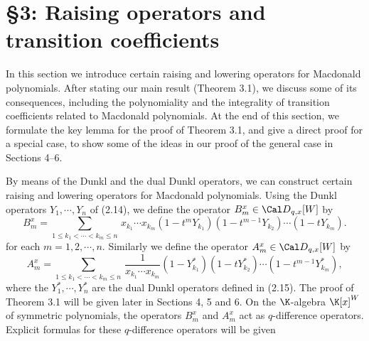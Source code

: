 \section{\S3: Raising operators and transition coefficients}
In this section we introduce certain raising and lowering operators 
for Macdonald polynomials.  
After stating our main result (Theorem 3.1), 
we discuss some of its consequences, 
including the polynomiality and the integrality of 
transition coefficients related to Macdonald polynomials.   
At the end of this section, we formulate the key lemma 
for the proof of Theorem 3.1, and give a direct proof for a special case, 
to show some of the ideas in our proof of the general case in 
Sections 4--6. 
%
\par\medpagebreak
By means of the Dunkl and the dual Dunkl operators, we can construct 
certain raising and lowering operators for Macdonald polynomials. 
Using the Dunkl operators $Y_1,\cdots, Y_n$ of (2.14), 
we define the operator $B^x_m \in {\Cal D}_{q,x}[W]$ by
$$
B^x_m=\sum_{1\le k_1<\cdots<k_m\le n}\,
x_{k_1}\cdots x_{k_m}
(1-t^m Y_{k_1})(1-t^{m-1}Y_{k_2})\cdots(1-tY_{k_m}).  
\tag{3.1}
$$
for each $m=1,2,\cdots,n$. 
Similarly we define the operator  $A^x_m\in {\Cal D}_{q,x}[W]$ by
$$
A^x_m=\sum_{1\le k_1<\cdots<k_m\le n}\,
\frac{1}{x_{k_1}\cdots x_{k_m}}
(1-Y_{k_1}^\ast)(1-t Y_{k_2}^\ast)\cdots(1-t^{m-1}Y_{k_m}^\ast), 
\tag{3.2}
$$
where the $Y^\ast_1, \cdots,Y^\ast_n$ are the dual Dunkl operators defined 
in (2.15). 
%
%
\noindent
The proof of Theorem 3.1 will be given later in Sections 4, 5 and 6.
On the $\K$-algebra $\K[x]^W$ of symmetric polynomials, the operators 
$B^x_m$ and $A^x_m$ act as $q$-difference operators. 
Explicit formulas for these $q$-difference operators will be given 
